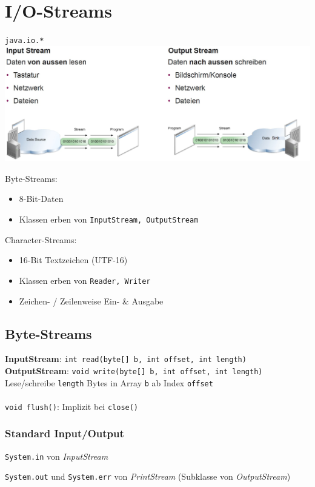 \section{I/O-Streams}
\verb|java.io.*|\\
\includegraphics[width=0.9\linewidth]{pictures/streams.jpg}

Byte-Streams:
\begin{itemize}
    \itemsep0em
    \item 8-Bit-Daten
    \item Klassen erben von \verb|InputStream, OutputStream|
\end{itemize}

Character-Streams:
\begin{itemize}
    \itemsep0em
    \item 16-Bit Textzeichen (UTF-16)
    \item Klassen erben von \verb|Reader, Writer|
    \item Zeichen- / Zeilenweise Ein- \& Ausgabe
\end{itemize}

\subsection{Byte-Streams}
\textbf{InputStream}: \verb|int read(byte[] b, int offset, int length)| \\
\textbf{OutputStream}: \verb|void write(byte[] b, int offset, int length)| \\
Lese/schreibe \verb|length| Bytes in Array \verb|b| ab Index \verb|offset|\\
\\
\verb|void flush()|: Implizit bei \verb|close()|

\subsubsection{Standard Input/Output}
\verb|System.in| von \textit{InputStream}

\verb|System.out| und \verb|System.err| von \textit{PrintStream} (Subklasse von \textit{OutputStream})

